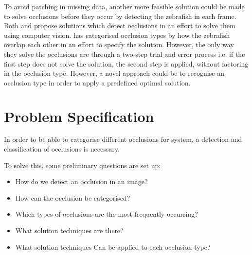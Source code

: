To avoid patching in missing data, another more feasible solution could be made to solve occlusions before they occur by detecting the zebrafish in each frame. Both \cite{Romero-Ferrero2019} and \cite{Dolado2014} propose solutions which detect occlusions in an effort to solve them using computer vision. \cite{Dolado2014} has categorised occlusion types by how the zebrafish overlap each other in an effort to specify the solution. However, the only way they solve the occlusions are through a two-step trial and error process i.e. if the first step does not solve the solution, the second step is applied, without factoring in the occlusion type. 
However, a novel approach could be to recognise an occlusion type in order to apply a predefined optimal solution.

\section{Problem Specification}
In order to be able to categorise different occlusions for system, a detection and classification of occlusions is necessary.

To solve this, some preliminary questions are set up:
\begin{itemize}
	\item How do we detect an occlusion in an image?
	\item How can the occlusion be categorised?
	\item Which types of occlusions are the most frequently occurring?
	\item What solution techniques are there? 
	\item What solution techniques Can be applied to each occlusion type?
\end{itemize}
